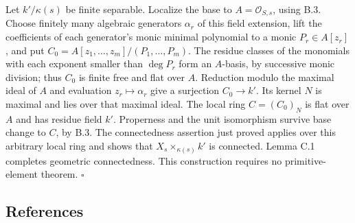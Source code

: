 \documentclass[11pt]{article}
\begin{document}
Let \(k'/\kappa(s)\) be finite separable. Localize the base to
\(A=\mathcal O_{S,s}\), using B.3. Choose finitely many algebraic
generators \(\alpha_r\) of this field extension, lift the coefficients
of each generator's monic minimal polynomial to a monic
\(P_r\in A[z_r]\), and put \(C_0=A[z_1,\ldots,z_m]/(P_1,\ldots,P_m)\).
The residue classes of the monomials with each exponent smaller than
\(\deg P_r\) form an \(A\)-basis, by successive monic division; thus
\(C_0\) is finite free and flat over \(A\). Reduction modulo the maximal
ideal of \(A\) and evaluation \(z_r\mapsto\alpha_r\) give a surjection
\(C_0\to k'\). Its kernel \(N\) is maximal and lies over that maximal
ideal. The local ring \(C=(C_0)_N\) is flat over \(A\) and has residue
field \(k'\). Properness and the unit isomorphism survive base change to
\(C\), by B.3. The connectedness assertion just proved applies over this
arbitrary local ring and shows that \(X_s\times_{\kappa(s)}k'\) is
connected. Lemma C.1 completes geometric connectedness. This
construction requires no primitive-element theorem. \(\square\)

\subsection{References}\label{references-3}
\end{document}
